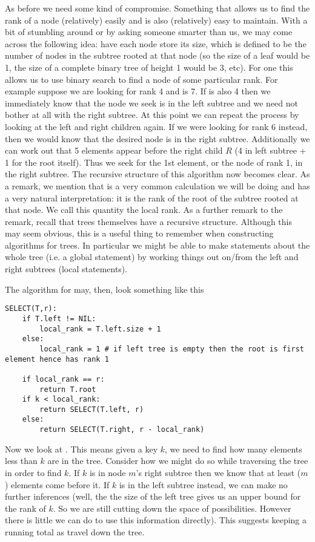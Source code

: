 As before we need some kind of compromise. Something that allows us to find the rank of a node (relatively) easily and is also (relatively) easy to maintain. With a bit of stumbling around or by asking someone smarter than us, we may come across the following idea: have each node store its size, which is defined to be the number of nodes in the subtree rooted at that node (so the size of a leaf would be 1, the size of a complete binary tree of height 1 would be 3, etc). For one this allows us to use binary search to find a node of some particular rank. For example suppose we are looking for rank 4 and  is 7. If  is also 4 then we immediately know that the node we seek is in the left subtree and we need not bother at all with the right subtree. At this point we can repeat the process by looking at the left and right children again. If we were looking for rank 6 instead, then we would know that the desired node is in the right subtree. Additionally we can work out that 5 elements appear before the right child $R$ (4 in left subtree + 1 for the root itself). Thus we seek for the 1st element, or the node of rank 1, in the right subtree. The recursive structure of this algorithm now becomes clear. As a remark, we mention that  is a very common calculation we will be doing and has a very natural interpretation: it is the rank of the root of the subtree rooted at that node. We call this quantity the local rank. As a further remark to the remark, recall that trees themselves have a recursive structure. Although this may seem obvious, this is a useful thing to remember when constructing algorithms for trees. In particular we might be able to make statements about the whole tree (i.e. a global statement) by working things out on/from the left and right subtrees (local statements).

The algorithm for  may, then, look something like this
\begin{lstlisting}
SELECT(T,r):
    if T.left != NIL:
        local_rank = T.left.size + 1
    else:
        local_rank = 1 # if left tree is empty then the root is first element hence has rank 1
        
    if local_rank == r:
        return T.root
    if k < local_rank:
        return SELECT(T.left, r)
    else:
        return SELECT(T.right, r - local_rank)
\end{lstlisting}

Now we look at . This means given a key $k$, we need to find how many elements less than $k$ are in the tree. Consider how we might do so while traversing the tree in order to find $k$. If $k$ is in node $m$'s right subtree then we know that at least ($m$) elements come before it. If $k$ is in the left subtree instead, we can make no further inferences (well, the the size of the left tree gives us an upper bound for the rank of $k$. So we are still cutting down the space of possibilities. However there is little we can do to use this information directly). This suggests keeping a running total as travel down the tree.


